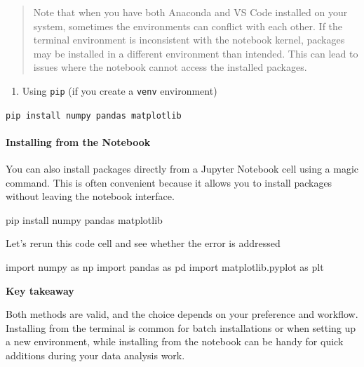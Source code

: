 \documentclass[
  letterpaper,
  DIV=11,
  numbers=noendperiod]{scrreprt}
\let\oldparagraph\paragraph
\renewcommand{\paragraph}[1]{\oldparagraph{#1}\mbox{}}
\newenvironment{Shaded}{\begin{snugshade}}{\end{snugshade}}
\newcommand{\ImportTok}[1]{\textcolor[rgb]{0.00,0.46,0.62}{#1}}
\newcommand{\NormalTok}[1]{\textcolor[rgb]{0.00,0.23,0.31}{#1}}
\providecommand{\tightlist}{%
  \setlength{\itemsep}{0pt}\setlength{\parskip}{0pt}}\usepackage{longtable,booktabs,array}
\begin{document}
\begin{quote}
Note that when you have both Anaconda and VS Code installed on your
system, sometimes the environments can conflict with each other. If the
terminal environment is inconsistent with the notebook kernel, packages
may be installed in a different environment than intended. This can lead
to issues where the notebook cannot access the installed packages.
\end{quote}

\begin{enumerate}
\def\labelenumi{\arabic{enumi}.}
\setcounter{enumi}{1}
\tightlist
\item
  Using \texttt{pip} (if you create a \texttt{venv} environment)
\end{enumerate}

\texttt{pip\ install\ numpy\ pandas\ matplotlib}

\hypertarget{installing-from-the-notebook}{%
\paragraph{Installing from the
Notebook}\label{installing-from-the-notebook}}

You can also install packages directly from a Jupyter Notebook cell
using a magic command. This is often convenient because it allows you to
install packages without leaving the notebook interface.

\begin{Shaded}
\begin{Highlighting}[]
\NormalTok{pip install numpy pandas matplotlib}
\end{Highlighting}
\end{Shaded}

Let's rerun this code cell and see whether the error is addressed

\begin{Shaded}
\begin{Highlighting}[]
\ImportTok{import}\NormalTok{ numpy }\ImportTok{as}\NormalTok{ np}
\ImportTok{import}\NormalTok{ pandas }\ImportTok{as}\NormalTok{ pd}
\ImportTok{import}\NormalTok{ matplotlib.pyplot }\ImportTok{as}\NormalTok{ plt}
\end{Highlighting}
\end{Shaded}

\textbf{Key takeaway}

Both methods are valid, and the choice depends on your preference and
workflow. Installing from the terminal is common for batch installations
or when setting up a new environment, while installing from the notebook
can be handy for quick additions during your data analysis work.
\end{document}
